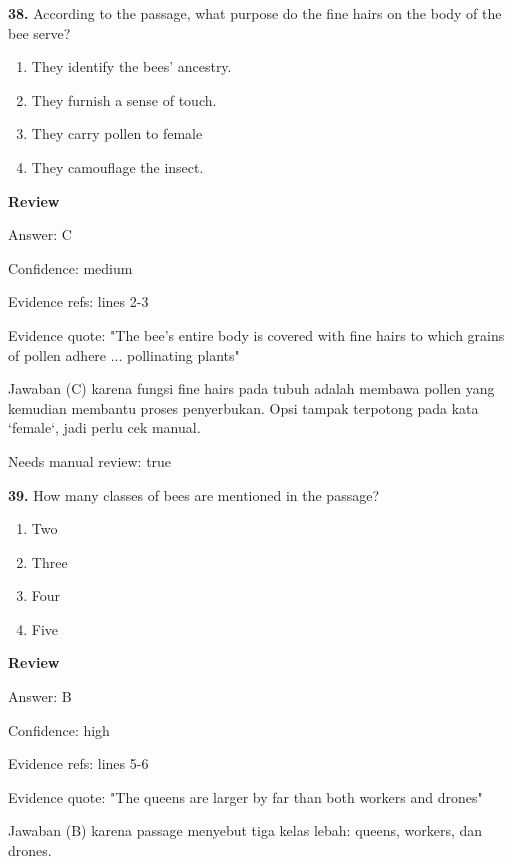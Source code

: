 \documentclass[12pt]{article}
\begin{document}
\endgroup
\par
\vspace{0.25\baselineskip}
\noindent\textbf{38.} According to the passage, what purpose do the fine hairs on the body of the bee serve?
\begin{enumerate}[label=(\Alph*),leftmargin=*,itemsep=0.2em]
\item They identify the bees' ancestry.
\item They furnish a sense of touch.
\item They carry pollen to female
\item They camouflage the insect.
\end{enumerate}
\par
\begingroup
\setlength{\parskip}{0pt}
\setlength{\parindent}{0pt}
\textbf{Review}\par
Answer: C\par
Confidence: medium\par
Evidence refs: lines 2-3\par
Evidence quote: "The bee's entire body is covered with fine hairs to which grains of pollen adhere ... pollinating plants"\par
Jawaban (C) karena fungsi fine hairs pada tubuh adalah membawa pollen yang kemudian membantu proses penyerbukan. Opsi tampak terpotong pada kata `female`, jadi perlu cek manual.\par
Needs manual review: true\par
\endgroup
\par
\vspace{0.25\baselineskip}
\noindent\textbf{39.} How many classes of bees are mentioned in the passage?
\begin{enumerate}[label=(\Alph*),leftmargin=*,itemsep=0.2em]
\item Two
\item Three
\item Four
\item Five
\end{enumerate}
\par
\begingroup
\setlength{\parskip}{0pt}
\setlength{\parindent}{0pt}
\textbf{Review}\par
Answer: B\par
Confidence: high\par
Evidence refs: lines 5-6\par
Evidence quote: "The queens are larger by far than both workers and drones"\par
Jawaban (B) karena passage menyebut tiga kelas lebah: queens, workers, dan drones.\par
\end{document}
